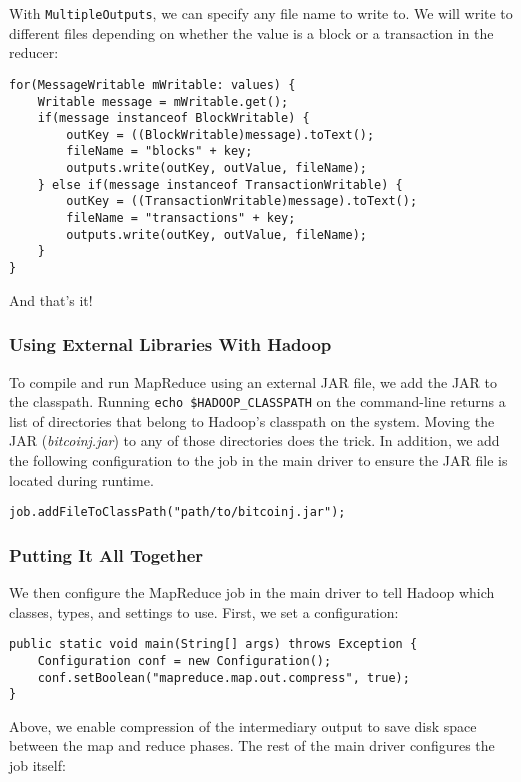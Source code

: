 \documentclass[9pt,twocolumn,twoside]{idsi}
\begin{document}
With \lstinline{MultipleOutputs}, we can specify any file name to write to. We will write to different files depending on whether the value is a block or a transaction in the reducer:

\begin{lstlisting}
for(MessageWritable mWritable: values) {
    Writable message = mWritable.get();
    if(message instanceof BlockWritable) {
        outKey = ((BlockWritable)message).toText();
        fileName = "blocks" + key;
        outputs.write(outKey, outValue, fileName);
    } else if(message instanceof TransactionWritable) {
        outKey = ((TransactionWritable)message).toText();
        fileName = "transactions" + key;
        outputs.write(outKey, outValue, fileName);
    }
}
\end{lstlisting}

And that's it!

\subsubsection{Using External Libraries With Hadoop}
To compile and run MapReduce using an external JAR file, we add the JAR to the classpath. Running \lstinline{echo $HADOOP_CLASSPATH} on the command-line returns a list of directories that belong to Hadoop's classpath on the system. Moving the JAR (\emph{bitcoinj.jar}) to any of those directories does the trick. In addition, we add the following configuration to the job in the main driver to ensure the JAR file is located during runtime.

\begin{lstlisting}
job.addFileToClassPath("path/to/bitcoinj.jar");
\end{lstlisting}

\subsubsection{Putting It All Together}
We then configure the MapReduce job in the main driver to tell Hadoop which classes, types, and settings to use. First, we set a configuration:

\begin{lstlisting}
public static void main(String[] args) throws Exception {
    Configuration conf = new Configuration();
    conf.setBoolean("mapreduce.map.out.compress", true);
}
\end{lstlisting}

Above, we enable compression of the intermediary output to save disk space between the map and reduce phases. The rest of the main driver configures the job itself:
\end{document}
